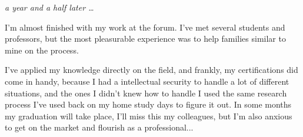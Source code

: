 \textit{a year and a half later \ldots }

I'm almost finished with my work at the forum. I've met several students and
professors, but the most pleasurable experience was to help families similar to
mine on the process. 

I've applied my knowledge directly on the field, and frankly, my certifications
did come in handy, because I had a intellectual security to handle a lot of
different situations, and the ones I didn't knew how to handle I used the same
research process I've used back on my home study days to figure it out. In some
months my graduation will take place, I'll miss this my colleagues, but I'm also
anxious to get on the market and flourish as a professional...



